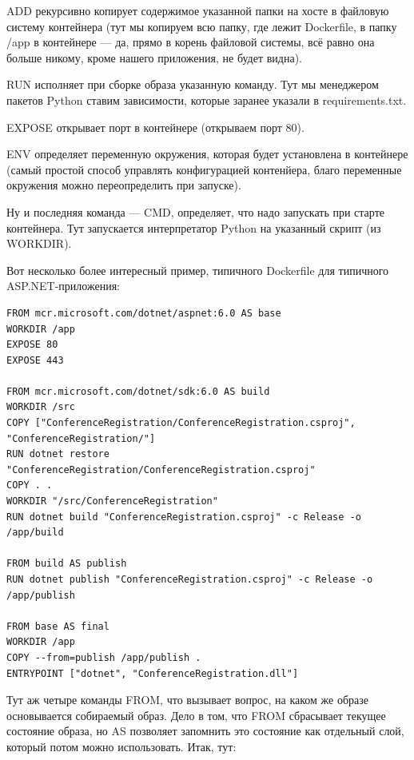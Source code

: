 \documentclass[a5paper]{article}
\begin{document}
ADD рекурсивно копирует содержимое указанной папки на хосте в файловую систему контейнера (тут мы копируем всю папку, где лежит Dockerfile, в папку /app в контейнере --- да, прямо в корень файловой системы, всё равно она больше никому, кроме нашего приложения, не будет видна).

RUN исполняет при сборке образа указанную команду. Тут мы менеджером пакетов Python ставим зависимости, которые заранее указали в requirements.txt.

EXPOSE открывает порт в контейнере (открываем порт 80).

ENV определяет переменную окружения, которая будет установлена в контейнере (самый простой способ управлять конфигурацией контенйера, благо переменные окружения можно переопределить при запуске).

Ну и последняя команда --- CMD, определяет, что надо запускать при старте контейнера. Тут запускается интерпретатор Python на указанный скрипт (из WORKDIR).

Вот несколько более интересный пример, типичного Dockerfile для типичного ASP.NET-приложения:

\begin{verbatim}
FROM mcr.microsoft.com/dotnet/aspnet:6.0 AS base
WORKDIR /app
EXPOSE 80
EXPOSE 443

FROM mcr.microsoft.com/dotnet/sdk:6.0 AS build
WORKDIR /src
COPY ["ConferenceRegistration/ConferenceRegistration.csproj", "ConferenceRegistration/"]
RUN dotnet restore "ConferenceRegistration/ConferenceRegistration.csproj"
COPY . .
WORKDIR "/src/ConferenceRegistration"
RUN dotnet build "ConferenceRegistration.csproj" -c Release -o /app/build

FROM build AS publish
RUN dotnet publish "ConferenceRegistration.csproj" -c Release -o /app/publish

FROM base AS final
WORKDIR /app
COPY --from=publish /app/publish .
ENTRYPOINT ["dotnet", "ConferenceRegistration.dll"]
\end{verbatim}

Тут аж четыре команды FROM, что вызывает вопрос, на каком же образе основывается собираемый образ. Дело в том, что FROM сбрасывает текущее состояние образа, но AS позволяет запомнить это состояние как отдельный слой, который потом можно использовать. Итак, тут:
\end{document}
